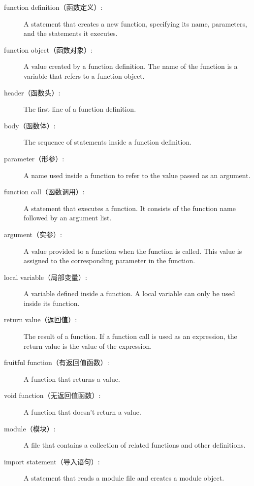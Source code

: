 \documentclass[10pt]{book}
\begin{document}
\begin{CJK}{UTF8}{gbsn}
\begin{description}
\item[function definition（函数定义）:]  A statement that creates a new function,
specifying its name, parameters, and the statements it executes.

\item[function object（函数对象）:]  A value created by a function definition.
The name of the function is a variable that refers to a function
object.

\item[header（函数头）:] The first line of a function definition.

\item[body（函数体）:] The sequence of statements inside a function definition.

\item[parameter（形参）:] A name used inside a function to refer to the value
passed as an argument.

\item[function call（函数调用）:] A statement that executes a function. It
consists of the function name followed by an argument list.

\item[argument（实参）:]  A value provided to a function when the function is called.
This value is assigned to the corresponding parameter in the function.

\item[local variable（局部变量）:]  A variable defined inside a function.  A local
variable can only be used inside its function.

\item[return value（返回值）:]  The result of a function.  If a function call
is used as an expression, the return value is the value of
the expression.

\item[fruitful function（有返回值函数）:] A function that returns a value.

\item[void function（无返回值函数）:] A function that doesn't return a value.

\item[module（模块）:] A file that contains a
collection of related functions and other definitions.

\item[import statement（导入语句）:] A statement that reads a module file and creates
a module object.


\end{description}
\end{CJK}
\end{document}
